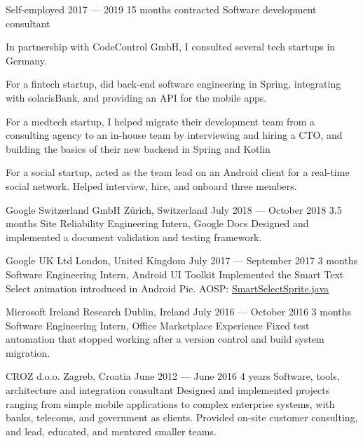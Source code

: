 \documentclass[10pt, a4paper, final, onecolumn, oneside, notitlepage]{article}
\newcommand{\innersectionspacing}[0]{ \vspace{4pt} } %
\begin{document}
\begin{center}
\experience
	{Self-employed}
	{}
	{2017 --- 2019}
	{15 months contracted}
	{Software development consultant}
	{
		In partnership with CodeControl GmbH, I consulted several tech startups in Germany.
		\begin{projectList}
			\item{For a fintech startup, did back-end software engineering in Spring, integrating with solarisBank, and providing an API for the mobile apps.} %
			\item{For a medtech startup, I helped migrate their development team from a consulting agency to an in-house team by interviewing and hiring a CTO, and building the basics of their new backend in Spring and Kotlin} %
      	\item{For a social startup, acted as the team lead on an Android client for a real-time social network. Helped interview, hire, and onboard three members.} %
		\end{projectList}
	}

\innersectionspacing
	
\experience
	{Google Switzerland GmbH}
	{Zürich, Switzerland}
	{July 2018 --- October 2018}
	{3.5 months}
	{Site Reliability Engineering Intern, Google Docs}
	{Designed and implemented a document validation and testing framework.}

\innersectionspacing

\experience
	{Google UK Ltd}
	{London, United Kingdom}
	{July 2017 --- September 2017}
	{3 months}
	{Software Engineering Intern, Android UI Toolkit}
	{Implemented the Smart Text Select animation introduced in Android Pie. AOSP: \href{https://cs.android.com/android/platform/superproject/+/android-latest-release:frameworks/base/core/java/android/widget/SmartSelectSprite.java;bpv=1}{\faLink SmartSelectSprite.java}}

\innersectionspacing

\experience
	{Microsoft Ireland Research}
	{Dublin, Ireland}
	{July 2016 --- October 2016}
	{3 months}
	{Software Engineering Intern, Office Marketplace Experience}
	{Fixed test automation that stopped working after a version control and build system migration.}

\innersectionspacing

\experience
	{CROZ d.o.o.}
	{Zagreb, Croatia}
	{June 2012 --- June 2016}
	{4 years}
	{Software, tools, architecture and integration consultant }
	{Designed and implemented projects ranging from simple mobile applications to complex enterprise systems, with banks, telecoms, and government as clients. Provided on-site customer consulting, and lead, educated, and mentored smaller teams.}


\end{center}
\end{document}
